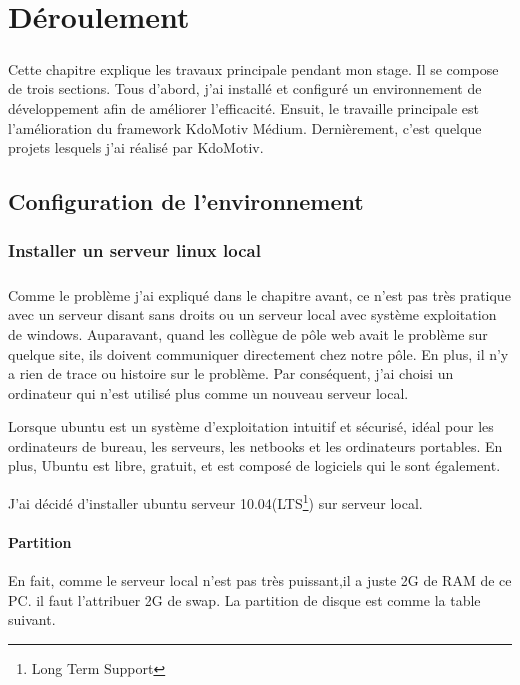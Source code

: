 \chapter{Déroulement}\thispagestyle{fancy}

\paragraph{}
Cette chapitre explique les travaux principale pendant mon stage. Il se compose de trois sections. Tous d'abord, j'ai installé et configuré un environnement de développement afin de améliorer l'efficacité. Ensuit, le travaille principale est l'amélioration du framework KdoMotiv Médium. Dernièrement, c'est quelque projets lesquels j'ai réalisé par KdoMotiv.

\section[Configuration]{Configuration de l'environnement}

\subsection{Installer un serveur linux local}
\paragraph{}
Comme le problème j'ai expliqué dans le chapitre avant, ce n'est pas très pratique avec un serveur disant sans droits ou un serveur local avec système exploitation de windows.
Auparavant, quand les collègue de pôle web avait le problème sur quelque site, ils doivent communiquer directement chez notre pôle. En plus, il n'y a rien de trace ou histoire sur le problème. 
Par conséquent, j'ai choisi un ordinateur qui n'est utilisé plus comme un nouveau serveur local. 

Lorsque ubuntu est un système d'exploitation intuitif et sécurisé, idéal pour les ordinateurs de bureau, les serveurs, les netbooks et les ordinateurs portables. En plus, Ubuntu est libre, gratuit, et est composé de logiciels qui le sont également.

J'ai décidé d'installer ubuntu serveur 10.04(LTS\footnote{Long Term Support}) sur serveur local.

\subsubsection{Partition}
En fait, comme le serveur local n'est pas très puissant,il a juste 2G de RAM de ce PC.  il faut l'attribuer 2G de swap. La partition de disque est comme la table suivant.

